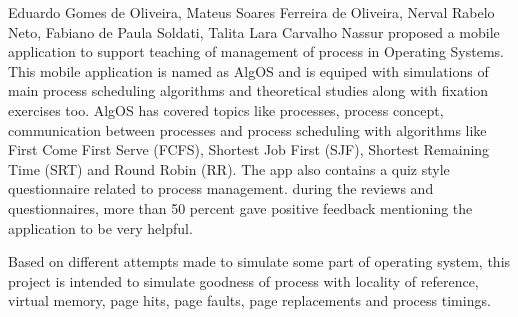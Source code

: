 \begin{onehalfspacing}
\par Eduardo Gomes de Oliveira, Mateus Soares Ferreira de Oliveira, Nerval Rabelo Neto, Fabiano de Paula Soldati, Talita Lara Carvalho Nassur \cite{Eduard} proposed a mobile application to support teaching of management of process in Operating Systems. This mobile application is named as AlgOS and is equiped with simulations of main process scheduling algorithms and theoretical studies along with fixation exercises too. AlgOS has covered topics like processes, process concept, communication between processes and process scheduling with algorithms like First Come First Serve (FCFS), Shortest Job First (SJF), Shortest Remaining Time (SRT) and Round Robin (RR). The app also contains a quiz style questionnaire related to process management. during the reviews and questionnaires, more than 50 percent gave positive feedback mentioning the application to be very helpful.\newline

Based on different attempts made to simulate some part of operating system, this project is intended to simulate goodness of process with locality of reference, virtual memory, page hits, page faults, page replacements and process timings.













































\end{onehalfspacing}



